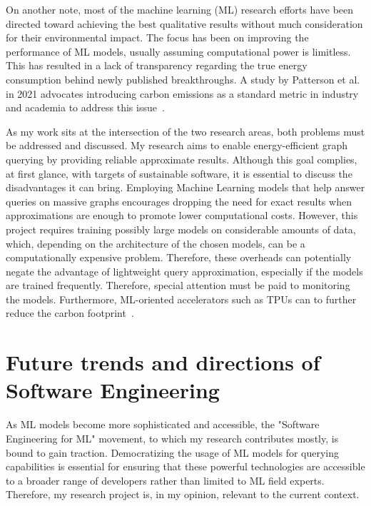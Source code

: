 \documentclass[a4paper, 11pt]{article}
\begin{document}
On another note, most of the machine learning (ML) research efforts have been directed toward achieving the best qualitative results without much consideration for their environmental impact. The focus has been on improving the performance of ML models, usually assuming computational power is limitless. This has resulted in a lack of transparency regarding the true energy consumption behind newly published breakthroughs. A study by Patterson et al. in 2021 advocates introducing carbon emissions as a standard metric in industry and academia to address this issue~\cite{DBLP:journals/corr/abs-2104-10350}.

As my work sits at the intersection of the two research areas, both problems must be addressed and discussed. My research aims to enable energy-efficient graph querying by providing reliable approximate results. Although this goal complies, at first glance, with targets of sustainable software, it is essential to discuss the disadvantages it can bring. Employing Machine Learning models that help answer queries on massive graphs encourages dropping the need for exact results when approximations are enough to promote lower computational costs. However, this project requires training possibly large models on considerable amounts of data, which, depending on the architecture of the chosen models, can be a computationally expensive problem. Therefore, these overheads can potentially negate the advantage of lightweight query approximation, especially if the models are trained frequently.  Therefore, special attention must be paid to monitoring the models. Furthermore, ML-oriented accelerators such as TPUs can to further reduce the carbon footprint~\cite{DBLP:journals/corr/abs-2104-10350}.


\section{Future trends and directions of Software Engineering}

As ML models become more sophisticated and accessible, the "Software Engineering for ML" movement, to which my research contributes mostly, is bound to gain traction. Democratizing the usage of ML models for querying capabilities is essential for ensuring that these powerful technologies are accessible to a broader range of developers rather than limited to ML field experts. Therefore, my research project is, in my opinion, relevant to the current context.
\end{document}
